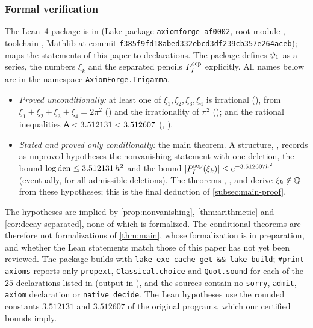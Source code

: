 \subsubsection*{Formal verification}
The Lean~4 package is in  (Lake package \texttt{axiomforge-af0002}, root module
, toolchain , Mathlib at commit
\texttt{f385f9fd18abed332ebcd3df239cb357e264aceb});  maps the statements of
this paper to declarations. The package defines $\psi_1$ as a series, the numbers $\xi_k$ and the
separated pencils $P^{\mathrm{sep}}_I$ explicitly. All names below are in the namespace
\texttt{AxiomForge.Trigamma}.
\begin{itemize}
  \item \emph{Proved unconditionally:} at least one of $\xi_1,\xi_2,\xi_3,\xi_4$ is irrational
  (), from
  $\xi_1+\xi_2+\xi_3+\xi_4=2\pi^2$ () and the irrationality of $\pi^2$
  (); and the rational inequalities $\mathsf{A}<3.512131<3.512607$
  (, ).
  \item \emph{Stated and proved only conditionally:} the main theorem. A structure,
  , records as unproved hypotheses the nonvanishing statement with one
  deletion, the bound $\log\operatorname{den}\le3.512131\,h^2$ and the bound
  $\lvert P^{\mathrm{sep}}_I(\xi_k)\rvert\le\mathrm{e}^{-3.512607h^2}$ (eventually, for all admissible deletions). The
  theorems , ,
   and  derive
  $\xi_k\notin\mathbb{Q}$ from these hypotheses; this is the final deduction of \cref{subsec:main-proof}.
\end{itemize}
The hypotheses are implied by \cref{prop:nonvanishing}, \cref{thm:arithmetic} and
\cref{cor:decay-separated}, none of which is formalized. The conditional theorems are therefore
not formalizations of \cref{thm:main}, whose formalization is in preparation, and whether the Lean
statements match those of this paper has not yet been reviewed. The package builds with
\texttt{lake exe cache get \&\& lake build}; \texttt{\#print axioms} reports only
\texttt{propext}, \texttt{Classical.choice} and \texttt{Quot.sound} for each of the $25$
declarations listed in  (output in ), and the
sources contain no \texttt{sorry}, \texttt{admit}, \texttt{axiom} declaration or
\texttt{native\_decide}. The Lean hypotheses use the rounded constants $3.512131$ and $3.512607$
of the original programs, which our certified bounds imply.
